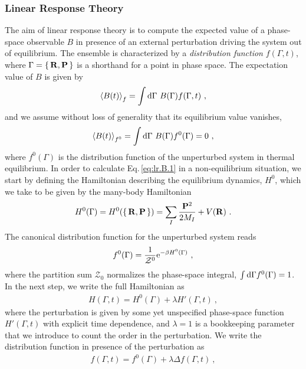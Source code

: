 \subsubsection{Linear Response Theory}
The aim of linear response theory is to compute the expected value of a phase-space observable $B$ in presence of an external perturbation driving the system out of equilibrium. The ensemble is characterized by a \emph{distribution function} $f(\Gamma, t)$, where $\Gamma = \set{{\bf R}, {\bf P}}$ is a shorthand for a point in phase space. The expectation value of $B$ is given by
\begin{align}
  \braket{B (t)}_f
    = \int {\rm d} \Gamma ~ B (\Gamma) f(\Gamma, t)~,
  \label{eq:lr.B.1}
\end{align}
and we assume without loss of generality that its equilibrium value vanishes,
\begin{align}
\braket{B (t)}_{f^0}
= \int {\rm d} \Gamma ~ B (\Gamma) f^0(\Gamma) = 0~,
\label{eq:lr.B0}
\end{align}
where $f^0 (\Gamma)$ is the distribution function of the unperturbed system in thermal equilibrium. In order to calculate Eq.\,\eqref{eq:lr.B.1} in a non-equilibrium situation, we start by defining the Hamiltonian describing the equilibrium dynamics, $H^0$, which we take to be given by the many-body Hamiltonian
\begin{align}
  H^0 (\Gamma) 
    = H^0(\set{{\bf R}, {\bf P}})
    = \sum_I \frac{{\bf P}^2}{2 M_I} + V ({\bf R})~.
  \label{eq:lr.H0}
\end{align}
The canonical distribution function for the unperturbed system reads
\begin{align}
f^0 (\Gamma) 
= \frac{1}{\mathcal{Z}^0} {\rm e}^{- \beta H^0 (\Gamma)}~,
\label{eq:lr.f0}
\end{align}
where the partition sum $\mathcal{Z}_0$ normalizes the phase-space integral, \mbox{$\int {\rm d} \Gamma f^0 (\Gamma) = 1$}.
In the next step, we write the full Hamiltonian as
\begin{align}
  H (\Gamma, t)
   = H^0 (\Gamma) + \lambda H' (\Gamma, t)~,
  \label{eq:lr.H}
\end{align}
where the perturbation is given by some yet unspecified phase-space function $H' (\Gamma, t)$ with explicit time dependence, and $\lambda = 1$ is a bookkeeping parameter that we introduce to count the order in the perturbation.
We write the distribution function in presence of the perturbation as
\begin{align}
  f (\Gamma, t) = f^0(\Gamma) + \lambda \Delta f (\Gamma, t)~,
  \label{eq:lr.f}
\end{align}
